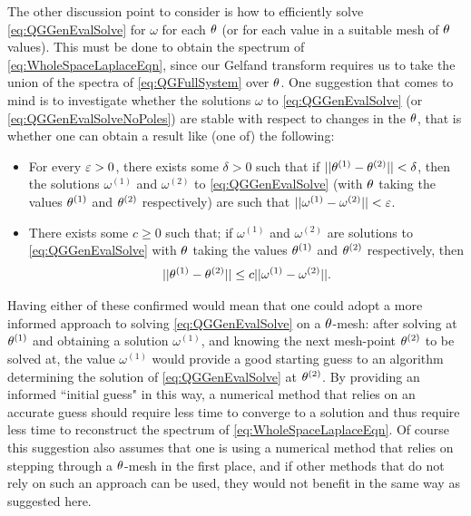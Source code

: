 The other discussion point to consider is how to efficiently solve \eqref{eq:QGGenEvalSolve} for $\omega$ for each $\theta$ (or for each value in a suitable mesh of $\theta$ values).
This must be done to obtain the spectrum of \eqref{eq:WholeSpaceLaplaceEqn}, since our Gelfand transform requires us to take the union of the spectra of \eqref{eq:QGFullSystem} over $\theta$.
One suggestion that comes to mind is to investigate whether the solutions $\omega$ to \eqref{eq:QGGenEvalSolve} (or \eqref{eq:QGGenEvalSolveNoPoles}) are stable with respect to changes in the $\theta$, that is whether one can obtain a result like (one of) the following:
\begin{itemize}
	\item For every $\varepsilon>0$, there exists some $\delta>0$ such that if $\lvert\lvert \theta^{(1)}-\theta^{(2)} \rvert\rvert<\delta$, then the solutions $\omega^{(1)}$ and $\omega^{(2)}$ to \eqref{eq:QGGenEvalSolve} (with $\theta$ taking the values $\theta^{(1)}$ and $\theta^{(2)}$ respectively) are such that $\lvert\lvert \omega^{(1)}-\omega^{(2)} \rvert\rvert<\varepsilon$.
	\item There exists some $c\geq 0$ such that; if $\omega^{(1)}$ and $\omega^{(2)}$ are solutions to \eqref{eq:QGGenEvalSolve} with $\theta$ taking the values $\theta^{(1)}$ and $\theta^{(2)}$ respectively, then
	\begin{align*}
		\lvert\lvert \theta^{(1)}-\theta^{(2)} \rvert\rvert \leq c \lvert\lvert \omega^{(1)}-\omega^{(2)} \rvert\rvert.
	\end{align*}
\end{itemize}
Having either of these confirmed would mean that one could adopt a more informed approach to solving \eqref{eq:QGGenEvalSolve} on a $\theta$-mesh: after solving at $\theta^{(1)}$ and obtaining a solution $\omega^{(1)}$, and knowing the next mesh-point $\theta^{(2)}$ to be solved at, the value $\omega^{(1)}$ would provide a good starting guess to an algorithm determining the solution of \eqref{eq:QGGenEvalSolve} at $\theta^{(2)}$.
By providing an informed ``initial guess" in this way, a numerical method that relies on an accurate guess should require less time to converge to a solution and thus require less time to reconstruct the spectrum of \eqref{eq:WholeSpaceLaplaceEqn}.
Of course this suggestion also assumes that one is using a numerical method that relies on stepping through a $\theta$-mesh in the first place, and if other methods that do not rely on such an approach can be used, they would not benefit in the same way as suggested here.
